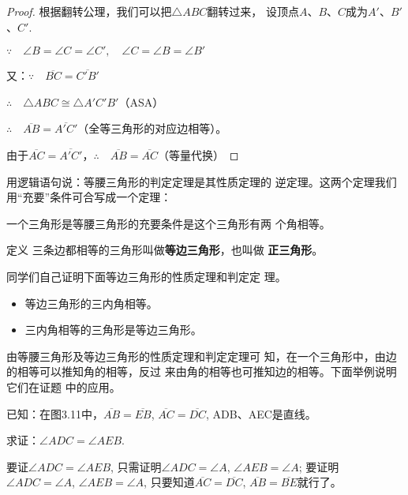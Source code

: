 \begin{proof}
    根据翻转公理，我们可以把$\triangle ABC$翻转过来，
    设顶点$A$、$B$、$C$成为$A'$、$B'$、$C'$.
    
    $\because\quad \angle B=\angle C=\angle C',\quad \angle C=\angle B=\angle B'$

    又：$\because\quad \overline{BC}=\overline{C'B'}$

    $\therefore\quad \triangle ABC\cong \triangle A'C'B'$（ASA）

    $\therefore\quad \overline{AB}=\overline{A'C'}$（全等三角形的对应边相等）。

由于$\overline{AC}=\overline{A'C'}$，$\therefore\quad \overline{AB}=\overline{AC}$（等量代换）
\end{proof}

用逻辑语句说：等腰三角形的判定定理是其性质定理的
逆定理。这两个定理我们用“充要”条件可合写成一个定理：

\begin{blk}{}
   一个三角形是等腰三角形的充要条件是这个三角形有两
个角相等。
\end{blk}


\begin{blk}{定义}
    三条边都相等的三角形叫做\textbf{等边三角形}，也叫做
    \textbf{正三角形}。
\end{blk}


同学们自己证明下面等边三角形的性质定理和判定定
理。

\begin{blk}{}
    \begin{itemize}
        \item 等边三角形的三内角相等。
        \item   三内角相等的三角形是等边三角形。
    \end{itemize}
\end{blk}

由等腰三角形及等边三角形的性质定理和判定定理可
知，在一个三角形中，由边的相等可以推知角的相等，反过
来由角的相等也可推知边的相等。下面举例说明它们在证题
中的应用。

\begin{example}
已知：在图3.11中，$\overline{AB}=\overline{EB}$, 
$\overline{AC}=\overline{DC}$, 
ADB、AEC是直线。

求证：$\angle ADC=\angle AEB$.
\end{example}

\begin{analyze}
    要证$\angle ADC=\angle AEB$,
只需证明$\angle ADC=\angle A$, $\angle AEB=\angle A$; 要证明
$\angle ADC=\angle A$, $\angle AEB=\angle A$, 只要知道$\overline{AC}=\overline{DC}$, 
$\overline{AB}=\overline{BE}$就行了。
\end{analyze}


